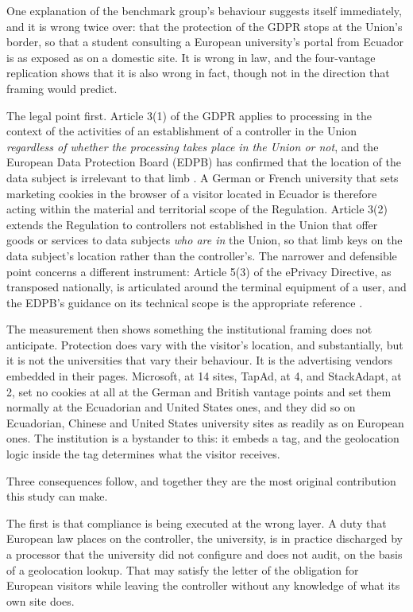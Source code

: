 \documentclass[pdflatex,sn-basic,Numbered,iicol]{sn-jnl}
\theoremstyle{thmstyleone}
\theoremstyle{thmstyletwo}
\theoremstyle{thmstylethree}
\begin{document}
	One explanation of the benchmark group's behaviour suggests itself immediately, and it is wrong twice over: that the protection of the GDPR stops at the Union's border, so that a student consulting a European university's portal from Ecuador is as exposed as on a domestic site. It is wrong in law, and the four-vantage replication shows that it is also wrong in fact, though not in the direction that framing would predict.
	
	The legal point first. Article 3(1) of the GDPR applies to processing in the context of the activities of an establishment of a controller in the Union \emph{regardless of whether the processing takes place in the Union or not}, and the European Data Protection Board (EDPB) has confirmed that the location of the data subject is irrelevant to that limb \citep{gdpr2016,edpb2019territorial}. A German or French university that sets marketing cookies in the browser of a visitor located in Ecuador is therefore acting within the material and territorial scope of the Regulation. Article 3(2) extends the Regulation to controllers not established in the Union that offer goods or services to data subjects \emph{who are in} the Union, so that limb keys on the data subject's location rather than the controller's. The narrower and defensible point concerns a different instrument: Article 5(3) of the ePrivacy Directive, as transposed nationally, is articulated around the terminal equipment of a user, and the EDPB's guidance on its technical scope is the appropriate reference \citep{eprivacy2002,edpb2024eprivacy}.
	
	The measurement then shows something the institutional framing does not anticipate. Protection does vary with the visitor's location, and substantially, but it is not the universities that vary their behaviour. It is the advertising vendors embedded in their pages. Microsoft, at 14 sites, TapAd, at 4, and StackAdapt, at 2, set no cookies at all at the German and British vantage points and set them normally at the Ecuadorian and United States ones, and they did so on Ecuadorian, Chinese and United States university sites as readily as on European ones. The institution is a bystander to this: it embeds a tag, and the geolocation logic inside the tag determines what the visitor receives.
	
	Three consequences follow, and together they are the most original contribution this study can make.
	
	The first is that compliance is being executed at the wrong layer. A duty that European law places on the controller, the university, is in practice discharged by a processor that the university did not configure and does not audit, on the basis of a geolocation lookup. That may satisfy the letter of the obligation for European visitors while leaving the controller without any knowledge of what its own site does.
	
\end{document}
